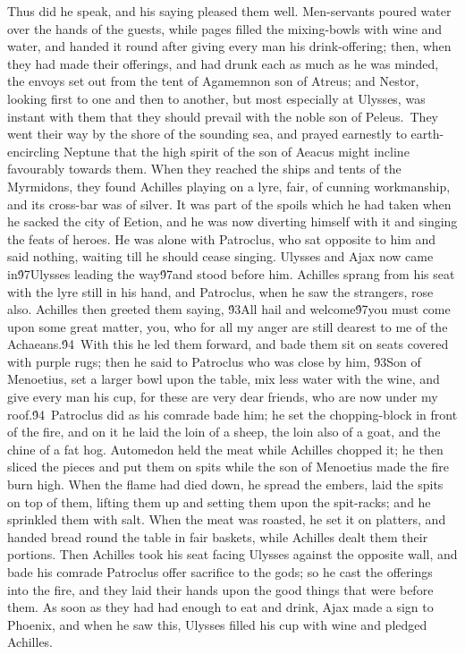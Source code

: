 {Thus did he speak, and his saying pleased them well. Men-servants poured water over the hands of the guests, while pages filled the mixing-bowls with wine and water, and handed it round after giving every man his drink-offering; then, when they had made their offerings, and had drunk each as much as he was minded, the envoys set out from the tent of Agamemnon son of Atreus; and Nestor, looking first to one and then to another, but most especially at Ulysses, was instant with them that they should prevail with the noble son of Peleus.\
They went their way by the shore of the sounding sea, and prayed earnestly to earth-encircling Neptune that the high spirit of the son of Aeacus might incline favourably towards them. When they reached the ships and tents of the Myrmidons, they found Achilles playing on a lyre, fair, of cunning workmanship, and its cross-bar was of silver. It was part of the spoils which he had taken when he sacked the city of Eetion, and he was now diverting himself with it and singing the feats of heroes. He was alone with Patroclus, who sat opposite to him and said nothing, waiting till he should cease singing. Ulysses and Ajax now came in\'97Ulysses leading the way\'97and stood before him. Achilles sprang from his seat with the lyre still in his hand, and Patroclus, when he saw the strangers, rose also. Achilles then greeted them saying, \'93All hail and welcome\'97you must come upon some great matter, you, who for all my anger are still dearest to me of the Achaeans.\'94\
With this he led them forward, and bade them sit on seats covered with purple rugs; then he said to Patroclus who was close by him, \'93Son of Menoetius, set a larger bowl upon the table, mix less water with the wine, and give every man his cup, for these are very dear friends, who are now under my roof.\'94\
Patroclus did as his comrade bade him; he set the chopping-block in front of the fire, and on it he laid the loin of a sheep, the loin also of a goat, and the chine of a fat hog. Automedon held the meat while Achilles chopped it; he then sliced the pieces and put them on spits while the son of Menoetius made the fire burn high. When the flame had died down, he spread the embers, laid the spits on top of them, lifting them up and setting them upon the spit-racks; and he sprinkled them with salt. When the meat was roasted, he set it on platters, and handed bread round the table in fair baskets, while Achilles dealt them their portions. Then Achilles took his seat facing Ulysses against the opposite wall, and bade his comrade Patroclus offer sacrifice to the gods; so he cast the offerings into the fire, and they laid their hands upon the good things that were before them. As soon as they had had enough to eat and drink, Ajax made a sign to Phoenix, and when he saw this, Ulysses filled his cup with wine and pledged Achilles.\
}
